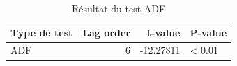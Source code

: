 \begin{table}[!h]
\centering
\caption{Résultat du test ADF}
\centering
\begin{tabular}[t]{lrrl}
\toprule
Type de test & Lag order & t-value & P-value\\
\midrule
ADF & 6 & -12.27811 & < 0.01\\
\bottomrule
\end{tabular}
\end{table}
